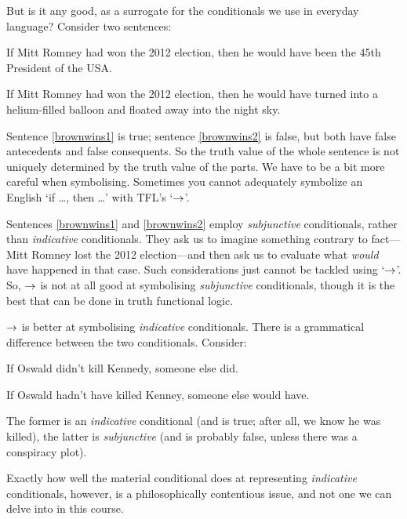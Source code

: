 But is it any good, as a surrogate for the conditionals we use in everyday language? Consider two sentences:
	\begin{earg}
		\item[\ex{brownwins1}] If Mitt Romney had won the 2012 election, then he would have been the 45th President of the USA.
		\item[\ex{brownwins2}] If Mitt Romney had won the 2012 election, then he would have turned into a helium-filled balloon and floated away into the night sky.
	\end{earg}
Sentence \ref{brownwins1} is true; sentence \ref{brownwins2} is false, but both have false antecedents and false consequents. So the truth value of the whole sentence is not uniquely determined by the truth value of the parts. We have to be a bit more careful when symbolising. Sometimes you cannot adequately symbolize an English `if \dots, then \dots' with TFL's `$\rightarrow$'.

Sentences \ref{brownwins1} and \ref{brownwins2} employ \emph{subjunctive} conditionals, rather than \emph{indicative} conditionals. They ask us to imagine something contrary to fact---Mitt Romney lost the 2012 election---and then ask us to evaluate what \emph{would} have happened in that case. Such considerations just cannot be tackled using `$\rightarrow$'.
So, $\rightarrow$ is not at all good at symbolising \emph{subjunctive} conditionals, though it is the best that can be done in truth functional logic.

$\rightarrow$ is better at symbolising \emph{indicative} conditionals.
There is a grammatical difference between the two conditionals. Consider:
\begin{earg}
\item[\ex{indicative}] If Oswald didn't kill Kennedy, someone else did.
\item[\ex{subjunctive}] If Oswald hadn't have killed Kenney, someone else would have.
\end{earg}
The former is an \emph{indicative} conditional (and is true; after all, we know he was killed), the latter is \emph{subjunctive} (and is probably false, unless there was a conspiracy plot).

Exactly how well the material conditional does at representing \emph{indicative} conditionals, however, is a philosophically contentious issue, and not one we can delve into in this course.

